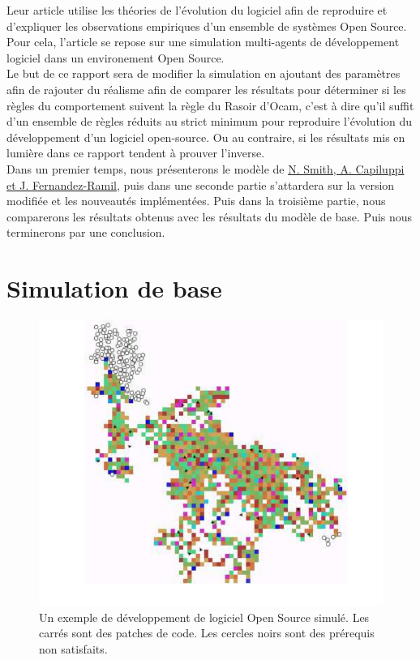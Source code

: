 \documentclass{article}
\begin{document}
Leur article utilise les théories de l'évolution du logiciel
afin de reproduire et d'expliquer les observations empiriques d'un ensemble
de systèmes Open Source. Pour cela, l'article se repose sur une
simulation multi-agents de développement logiciel dans un environement Open Source.
\\

Le but de ce rapport sera de modifier la simulation en ajoutant des
paramètres afin de rajouter du réalisme afin de comparer les résultats pour
déterminer si les règles du comportement suivent la règle du Rasoir d'Ocam, c'est à dire
qu'il suffit d'un ensemble de règles réduits au strict minimum pour reproduire l'évolution du
développement d'un logiciel open-source. Ou au contraire, si les résultats mis en lumière dans
ce rapport tendent à prouver l'inverse.
\\

Dans un premier temps, nous présenterons le modèle de \href{http://oro.open.ac.uk/4698/1/}{N. Smith, A. Capiluppi et J. Fernandez-Ramil},
puis dans une seconde partie s'attardera sur la version modifiée et les nouveautés implémentées. Puis
dans la troisième partie, nous comparerons les résultats obtenus avec les résultats du modèle de base.
Puis nous terminerons par une conclusion.

\newpage

\section{Simulation de base}

\begin{figure}[H]
  \centerline{\includegraphics[scale=0.45]{pictures/Image0.png}}
  \caption{Un exemple de développement de logiciel Open Source
    simulé. Les carrés sont des patches de code. Les cercles noirs
    sont des prérequis non satisfaits.}
\end{figure}
\end{document}
